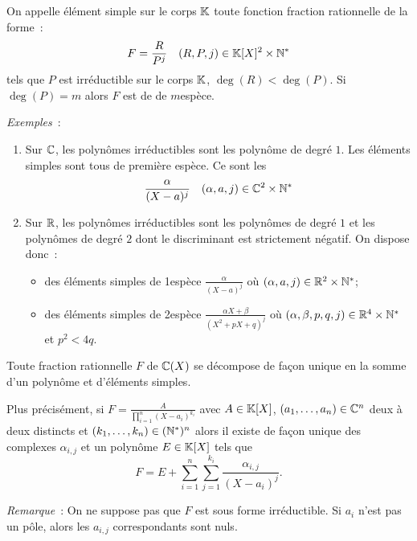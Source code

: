 \begin{defdef}
  On appelle élément simple sur le corps \(\mathbb{K}\) toute fonction fraction rationnelle de la forme~:
  \begin{equation}
    F=\frac{R}{P^j} \quad (R,P,j) \in \mathbb{K}[X]^2\times \mathbb{N}^*
  \end{equation}
  tels que \(P\) est irréductible sur le corps \(\mathbb{K}\), \(\deg(R) < \deg(P)\). Si \(\deg(P)=m\) alors \(F\) est de de \(m\)\ieme espèce.
\end{defdef}

\emph{Exemples}~:
\begin{enumerate}
\item Sur \(\mathbb{C}\), les polynômes irréductibles sont les polynôme de degré \(1\). Les éléments simples sont tous de première espèce. Ce sont les
  \begin{equation}
    \frac{\alpha}{(X-a)^j} \quad (\alpha,a,j)\in \mathbb{C}^2\times \mathbb{N}^*
  \end{equation}
\item Sur \(\mathbb{R}\), les polynômes irréductibles sont les polynômes de degré \(1\) et les polynômes de degré \(2\) dont le discriminant est strictement négatif. On dispose donc~:
  \begin{itemize}
  \item des éléments simples de 1\iere espèce \(\frac{\alpha}{(X-a)^j}\) où \((\alpha,a,j)\in \mathbb{R}^2\times \mathbb{N}^*\);
  \item des éléments simples de 2\ieme espèce \(\frac{\alpha X+\beta}{(X^2+pX+q)^j}\) où \((\alpha,\beta,p,q,j)\in \mathbb{R}^4\times \mathbb{N}^*\) et \(p^2<4q\).
  \end{itemize}
\end{enumerate}

\begin{theo}
  Toute fraction rationnelle \(F\) de \(\mathbb{C}(X)\) se décompose de façon unique en la somme d'un polynôme et d'éléments simples.

  Plus précisément, si \(F=\frac{A}{\prod_{i=1}^n(X-a_i)^{k_i}}\) avec \(A\in\mathbb{K}[X]\), \((a_1,\ldots,a_n) \in \mathbb{C}^n\) deux à deux distincts et \((k_1,\ldots,k_n)\in (\mathbb{N}^*)^n\) alors il existe de façon unique des complexes \(\alpha_{i,j}\) et un polynôme \(E\in\mathbb{K}[X]\) tels que
  \begin{equation}
    F=E+\sum_{i=1}^n\sum_{j=1}^{k_i} \frac{\alpha_{i,j}}{(X-a_i)^{j}}.
  \end{equation}
\end{theo}

\emph{Remarque}~: On ne suppose pas que \(F\) est sous forme irréductible. Si \(a_i\) n'est pas un pôle, alors les \(a_{i,j}\) correspondants sont nuls.

